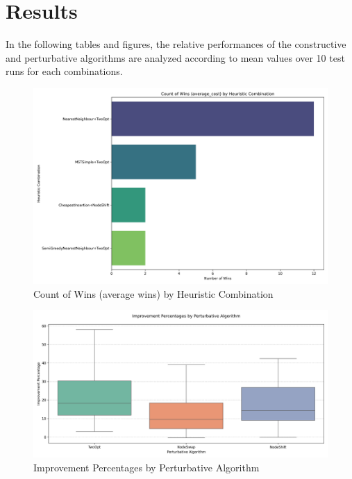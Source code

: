 \documentclass{article}
\begin{document}
\newpage
   
\section*{Results}

In the following tables and figures, the relative performances of the constructive and perturbative algorithms are analyzed according to mean values over 10 test runs for each combinations. 

\begin{figure}[h]
\centering
\includegraphics[width=\textwidth]{figures/count-of-wins-comparison.png}
\caption{Count of Wins (average wins) by Heuristic Combination}
\end{figure}


\begin{figure}[h]
\centering
\includegraphics[width=\textwidth]{figures/perturbative-improvement-pct.png}
\caption{Improvement Percentages by Perturbative Algorithm}
\end{figure}
\end{document}
